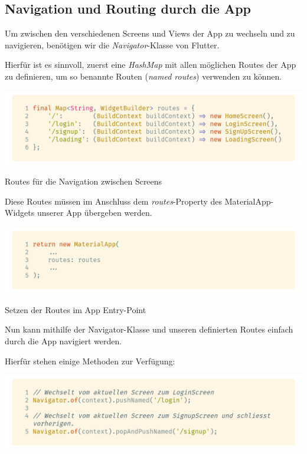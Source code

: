 \subsection{Navigation und Routing durch die App}

Um zwischen den verschiedenen Screens und Views der App zu wechseln und zu navigieren, benötigen wir die \textit{Navigator}-Klasse von Flutter.

Hierfür ist es sinnvoll, zuerst eine \textit{HashMap} mit allen möglichen Routes der App zu definieren, um so benannte Routen (\textit{named routes}) verwenden zu können.

\begin{code}
    \centering
    \includegraphics[width=1\textwidth]{images/Flutter/flutterRoutes.png}
    \vspace{-25pt}
    \caption{Routes für die Navigation zwischen Screens}
\end{code}

\newpage

Diese Routes müssen im Anschluss dem \textit{routes}-Property des MaterialApp-Widgets unserer App übergeben werden.

\begin{code}
    \centering
    \includegraphics[width=1\textwidth]{images/Flutter/flutterMainRoute.png}
    \vspace{-25pt}
    \caption{Setzen der Routes im App Entry-Point}
\end{code}

Nun kann mithilfe der Navigator-Klasse und unseren definierten Routes einfach durch die App navigiert werden.

Hierfür stehen einige Methoden zur Verfügung:

\begin{code}
    \centering
    \includegraphics[width=1\textwidth]{images/Flutter/flutterNavigatorOf.png}
    \vspace{-25pt}
    \caption{\lstinline{Navigator.of()}-Funktion zum Wechseln der Screens per \textit{namedRoutes}}
\end{code}

